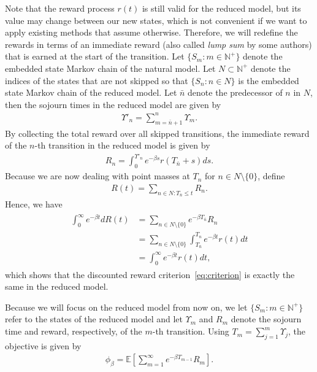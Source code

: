\documentclass{article}
\theoremstyle{definition}
\theoremstyle{plain}
\begin{document}
Note that the reward process $r(t)$ is still valid for the reduced model, but
its value may change between our new states, which is not convenient if we want
to apply existing methods that assume otherwise. Therefore, we will redefine the
rewards in terms of an immediate reward (also called \textit{lump sum} by some
authors) that is earned at the start of the transition.
%
Let $\{S_{m} : m \in \mathbb{N}^{+} \}$ denote the embedded state Markov chain
of the natural model. Let $N \subset \mathbb{N}^{+}$ denote the indices of the
states that are not skipped so that $\{S_{n} : n \in N \}$ is the embedded state
Markov chain of the reduced model. Let $\bar{n}$ denote the predecessor of
$n$ in $N$, then the sojourn times in the reduced model are given by
\begin{align}
  \Upsilon'_{n} = \sum_{m=\bar{n} + 1}^{n} \Upsilon_{m} .
\end{align}
%
By collecting the total reward over all skipped transitions, the immediate
reward of the $n$-th transition in the reduced model is given by
\begin{align}
  R_{n} = \int_{0}^{\Upsilon'_{n}} e^{- \beta s} r(T_{\bar{n}} + s) ds .
\end{align}
Because we are now dealing with point masses at $T_{n}$ for $n \in N \setminus \{ 0 \}$, define
\begin{align}
        R(t) = \sum_{n \in N : T_{\bar{n}} \leq t} R_{n} .
\end{align}
Hence, we have
\begin{align}
  \begin{split}
  \int_{0}^{\infty} e^{- \beta t} d R(t) &= \sum_{n \in N \setminus \{ 0 \}} e^{- \beta T_{\bar{n}}} R_{n} \\
   &= \sum_{n \in N \setminus \{ 0 \}} \int_{T_{\bar{n}}}^{T_{n}} e^{- \beta t} r(t) dt \\
   &= \int_{0}^{\infty} e^{-\beta t} r(t) dt ,
  \end{split}
\end{align}
which shows that the discounted reward criterion~\eqref{eq:criterion} is exactly the same in the
reduced model.

Because we will focus on the reduced model from now on, we let
$\{ S_{m} : m \in \mathbb{N}^{+} \}$ refer to the states of the reduced model
and let $\Upsilon_{m}$ and $R_{m}$ denote the sojourn time and reward,
respectively, of the $m$-th transition. Using
$T_{m} = \sum_{j=1}^{m} \Upsilon_{j}$, the objective is given by
\begin{align}
  \phi_{\beta} = \mathbb{E} \left[ \sum_{m=1}^{\infty} e^{- \beta T_{m-1}} R_{m} \right] .
\end{align}
\end{document}
